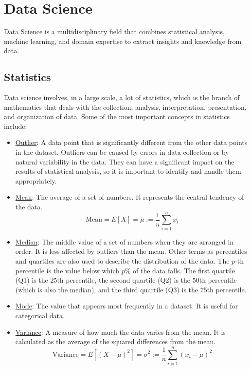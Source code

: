 \chapter{Data Science}

Data Science is a multidisciplinary field that combines statistical analysis, machine learning, and domain expertise to extract insights and knowledge from data. 

\section{Statistics}
Data science involves, in a large scale, a lot of statistics, which is the branch of mathematics that deals with the collection, analysis, interpretation, presentation, and organization of data. Some of the most important concepts in statistics include:
\begin{itemize}
    \item \ul{Outlier}: A data point that is significantly different from the other data points in the dataset. Outliers can be caused by errors in data collection or by natural variability in the data. They can have a significant impact on the results of statistical analysis, so it is important to identify and handle them appropriately.
    \item \ul{Mean}: The average of a set of numbers. It represents the central tendency of the data.
    \begin{equation*}
        \text{Mean} = E[X] = \mu := \frac{1}{n} \sum_{i=1}^{n} x_i
    \end{equation*}
    \item \ul{Median}: The middle value of a set of numbers when they are arranged in order. It is less affected by outliers than the mean. Other terms as percentiles and quartiles are also used to describe the distribution of the data. The $p$-th percentile is the value below which $p\%$ of the data falls. The first quartile (Q1) is the 25th percentile, the second quartile (Q2) is the 50th percentile (which is also the median), and the third quartile (Q3) is the 75th percentile.
    \item \ul{Mode}: The value that appears most frequently in a dataset. It is useful for categorical data.
    \item \ul{Variance}: A measure of how much the data varies from the mean. It is calculated as the average of the squared differences from the mean.
    \begin{equation*}
        \text{Variance} = E[(X - \mu)^2] = \sigma^2 := \frac{1}{n} \sum_{i=1}^{n} (x_i - \mu)^2

\end{equation*}
\end{itemize}
